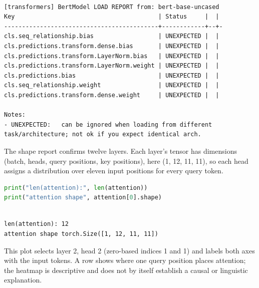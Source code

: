 \documentclass[../labs.tex]{subfiles}
\begin{document}
\hypertarget{out:lab03-bert-c22}{}\label{out:lab03-bert-c22}

\begin{lstlisting}[style=terminalOutput,breakatwhitespace=false,columns=fullflexible]

[transformers] BertModel LOAD REPORT from: bert-base-uncased
Key                                        | Status     |  |
-------------------------------------------+------------+--+-
cls.seq_relationship.bias                  | UNEXPECTED |  |
cls.predictions.transform.dense.bias       | UNEXPECTED |  |
cls.predictions.transform.LayerNorm.bias   | UNEXPECTED |  |
cls.predictions.transform.LayerNorm.weight | UNEXPECTED |  |
cls.predictions.bias                       | UNEXPECTED |  |
cls.seq_relationship.weight                | UNEXPECTED |  |
cls.predictions.transform.dense.weight     | UNEXPECTED |  |

Notes:
- UNEXPECTED:	can be ignored when loading from different task/architecture; not ok if you expect identical arch.

\end{lstlisting}


The shape report confirms twelve layers. Each layer’s tensor has dimensions (batch, heads, query positions, key positions), here (1, 12, 11, 11), so each head assigns a distribution over eleven input positions for every query token.


\begin{lstlisting}[language=Python,basicstyle=\ttfamily\scriptsize,breaklines=true,breakatwhitespace=false,columns=fullflexible,keepspaces=true,numbers=none]
print("len(attention):", len(attention))
print("attention shape", attention[0].shape)
\end{lstlisting}

\hypertarget{out:lab03-bert-c23}{}\label{out:lab03-bert-c23}

\begin{lstlisting}[style=terminalOutput,breakatwhitespace=false,columns=fullflexible]

len(attention): 12
attention shape torch.Size([1, 12, 11, 11])

\end{lstlisting}


This plot selects layer 2, head 2 (zero-based indices 1 and 1) and labels both axes with the input tokens. A row shows where one query position places attention; the heatmap is descriptive and does not by itself establish a causal or linguistic explanation.
\end{document}
